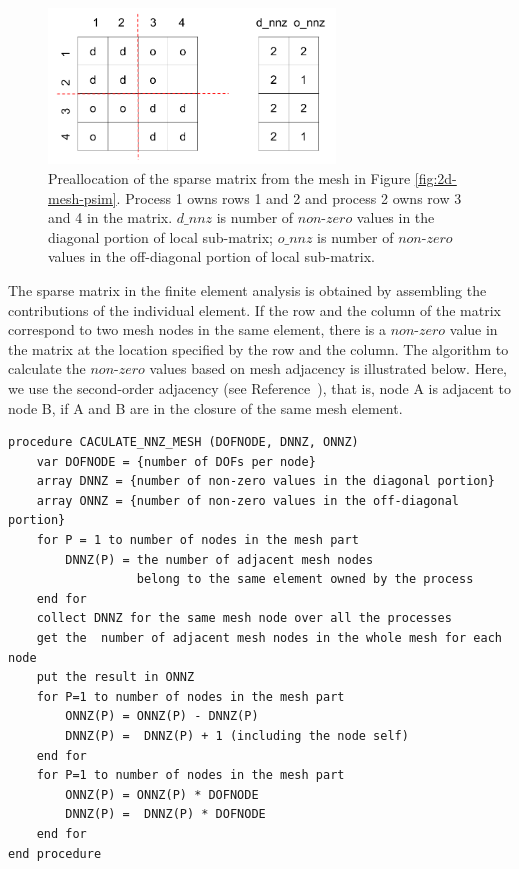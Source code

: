 \documentclass[11pt]{article}  %
\begin{document}
\begin{figure}
\center
\includegraphics[width=3in]{fig/sparseMatrix.png}
\caption{\small{Preallocation of the sparse matrix from the mesh in Figure \ref{fig:2d-mesh-psim}.  Process 1 owns rows 1 and 2 and process 2 owns row 3 and 4 in the matrix. $d\_nnz$ is number of $non$-$zero$ values in the diagonal portion of local sub-matrix; $o\_nnz$ is number of $non$-$zero$ values in the off-diagonal portion of local sub-matrix.}} 
\label{fig:sparseMatrix}
\end{figure}

 The sparse matrix in the finite element analysis is obtained by assembling the contributions of the individual element. If the row and the column of the matrix correspond to two mesh nodes in the same element, there is a $non$-$zero$ value in the matrix at the location specified by the row and the column.  The algorithm to calculate the $non$-$zero$ values based on mesh adjacency is illustrated below. Here, we use the second-order adjacency (see Reference~\cite{Seol2014}), that is,  node A is  adjacent to node B, if A and B  are in the closure of the same mesh element.  

\begin{samepage}
\begin{verbatim}
procedure CACULATE_NNZ_MESH (DOFNODE, DNNZ, ONNZ)
    var DOFNODE = {number of DOFs per node}
    array DNNZ = {number of non-zero values in the diagonal portion}
    array ONNZ = {number of non-zero values in the off-diagonal portion}
    for P = 1 to number of nodes in the mesh part
        DNNZ(P) = the number of adjacent mesh nodes
                  belong to the same element owned by the process 
    end for
    collect DNNZ for the same mesh node over all the processes
    get the  number of adjacent mesh nodes in the whole mesh for each node
    put the result in ONNZ
    for P=1 to number of nodes in the mesh part
        ONNZ(P) = ONNZ(P) - DNNZ(P)
        DNNZ(P) =  DNNZ(P) + 1 (including the node self)
    end for
    for P=1 to number of nodes in the mesh part
        ONNZ(P) = ONNZ(P) * DOFNODE
        DNNZ(P) =  DNNZ(P) * DOFNODE
    end for
end procedure
\end{verbatim}
\end{samepage}
\end{document}
